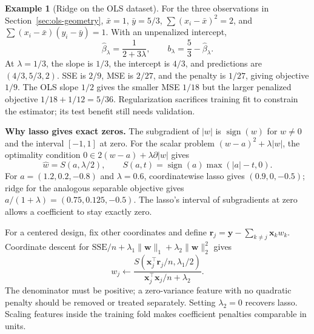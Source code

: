 \documentclass[11pt,twoside]{article}
\numberwithin{equation}{section}
\newcommand{\vect}[1]{\bm{#1}}
\theoremstyle{plain}
\theoremstyle{definition}
\newtheorem{example}[theorem]{Example}
\theoremstyle{remark}
\begin{document}
\begin{example}[Ridge on the OLS dataset]
For the three observations in Section~\ref{sec:ols-geometry}, $\bar x=1$, $\bar y=5/3$, $\sum(x_i-\bar x)^2=2$, and $\sum(x_i-\bar x)(y_i-\bar y)=1$. With an unpenalized intercept,
\[
\hat\beta_\lambda=\frac1{2+3\lambda},\qquad b_\lambda=\frac53-\hat\beta_\lambda.
\]
At $\lambda=1/3$, the slope is $1/3$, the intercept is $4/3$, and predictions are $(4/3,5/3,2)$. SSE is $2/9$, MSE is $2/27$, and the penalty is $1/27$, giving objective $1/9$. The OLS slope $1/2$ gives the smaller MSE $1/18$ but the larger penalized objective $1/18+1/12=5/36$. Regularization sacrifices training fit to constrain the estimator; its test benefit still needs validation.
\end{example}

\textbf{Why lasso gives exact zeros.} The subgradient of $|w|$ is $\operatorname{sign}(w)$ for $w\ne0$ and the interval $[-1,1]$ at zero. For the scalar problem $(w-a)^2+\lambda|w|$, the optimality condition $0\in2(w-a)+\lambda\partial|w|$ gives
\[
\hat w=S(a,\lambda/2),\qquad S(a,t)=\operatorname{sign}(a)\max(|a|-t,0).
\]
For $a=(1.2,0.2,-0.8)$ and $\lambda=0.6$, coordinatewise lasso gives $(0.9,0,-0.5)$; ridge for the analogous separable objective gives $a/(1+\lambda)=(0.75,0.125,-0.5)$. The lasso's interval of subgradients at zero allows a coefficient to stay exactly zero.

For a centered design, fix other coordinates and define $\vect r_j=\vect y-\sum_{k\ne j}\vect x_k w_k$. Coordinate descent for $\mathrm{SSE}/n+\lambda_1\|\vect w\|_1+\lambda_2\|\vect w\|_2^2$ gives
\[
w_j\leftarrow
\frac{S(\vect x_j^\top\vect r_j/n,\lambda_1/2)}{\vect x_j^\top\vect x_j/n+\lambda_2}.
\]
The denominator must be positive; a zero-variance feature with no quadratic penalty should be removed or treated separately. Setting $\lambda_2=0$ recovers lasso. Scaling features inside the training fold makes coefficient penalties comparable in units.
\end{document}
